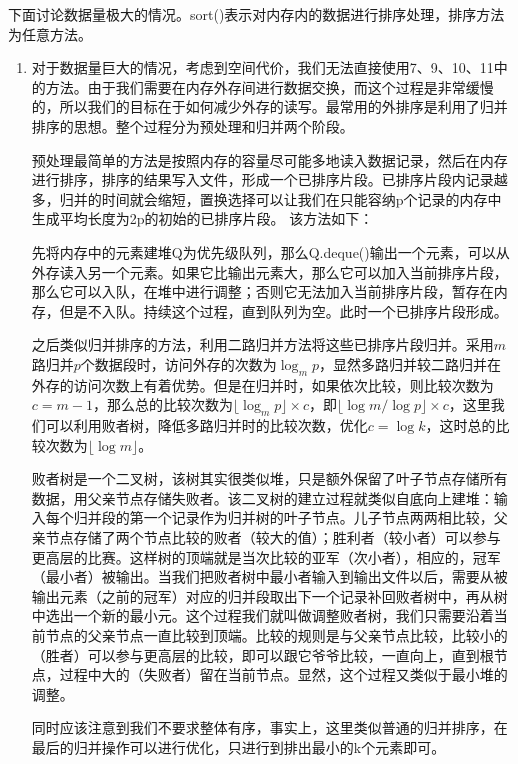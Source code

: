 \documentclass[12pt,a4paper]{article}
\theoremstyle{definition}
\begin{document}
	下面讨论数据量极大的情况。sort()表示对内存内的数据进行排序处理，排序方法为任意方法。
\begin{enumerate}	
	\item 对于数据量巨大的情况，考虑到空间代价，我们无法直接使用7、9、10、11中的方法。由于我们需要在内存外存间进行数据交换，而这个过程是非常缓慢的，所以我们的目标在于如何减少外存的读写。最常用的外排序是利用了归并排序的思想。整个过程分为预处理和归并两个阶段。
	
	预处理最简单的方法是按照内存的容量尽可能多地读入数据记录，然后在内存进行排序，排序的结果写入文件，形成一个已排序片段。已排序片段内记录越多，归并的时间就会缩短，置换选择可以让我们在只能容纳p个记录的内存中生成平均长度为2p的初始的已排序片段。 该方法如下：
	
	先将内存中的元素建堆Q为优先级队列，那么Q.deque()输出一个元素，可以从外存读入另一个元素。如果它比输出元素大，那么它可以加入当前排序片段，那么它可以入队，在堆中进行调整；否则它无法加入当前排序片段，暂存在内存，但是不入队。持续这个过程，直到队列为空。此时一个已排序片段形成。
	
	之后类似归并排序的方法，利用二路归并方法将这些已排序片段归并。采用$m$路归并$p$个数据段时，访问外存的次数为$\log_mp$，显然多路归并较二路归并在外存的访问次数上有着优势。但是在归并时，如果依次比较，则比较次数为$c=m-1$，那么总的比较次数为$\lfloor \log_mp\rfloor \times c$，即$\lfloor \log m/\log p\rfloor \times c$，这里我们可以利用败者树，降低多路归并时的比较次数，优化$c=\log k$，这时总的比较次数为$\lfloor \log m\rfloor$。
	
	败者树是一个二叉树，该树其实很类似堆，只是额外保留了叶子节点存储所有数据，用父亲节点存储失败者。该二叉树的建立过程就类似自底向上建堆：输入每个归并段的第一个记录作为归并树的叶子节点。儿子节点两两相比较，父亲节点存储了两个节点比较的败者（较大的值）；胜利者（较小者）可以参与更高层的比赛。这样树的顶端就是当次比较的亚军（次小者），相应的，冠军（最小者）被输出。当我们把败者树中最小者输入到输出文件以后，需要从被输出元素（之前的冠军）对应的归并段取出下一个记录补回败者树中，再从树中选出一个新的最小元。这个过程我们就叫做调整败者树，我们只需要沿着当前节点的父亲节点一直比较到顶端。比较的规则是与父亲节点比较，比较小的（胜者）可以参与更高层的比较，即可以跟它爷爷比较，一直向上，直到根节点，过程中大的（失败者）留在当前节点。显然，这个过程又类似于最小堆的调整。
	
	同时应该注意到我们不要求整体有序，事实上，这里类似普通的归并排序，在最后的归并操作可以进行优化，只进行到排出最小的k个元素即可。
	

\end{enumerate}
\end{document}
